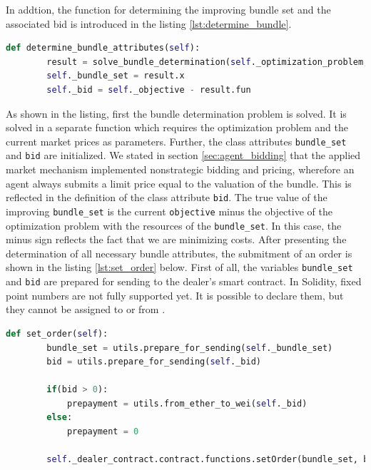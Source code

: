 In addtion, the function for determining the improving bundle set and the associated bid is introduced in the listing \ref{lst:determine_bundle}.

\begin{lstlisting}[label=lst:determine_bundle, caption=Determining of bundle attributes, language=Python]
    def determine_bundle_attributes(self):
        result = solve_bundle_determination(self._optimization_problem, self._mkt_prices)
        self._bundle_set = result.x
        self._bid = self._objective - result.fun
\end{lstlisting}

As shown in the listing, first the bundle determination problem is solved.
It is solved in a separate function which requires the optimization problem and the current market prices as parameters.
Further, the class attributes \verb|bundle_set| and \verb|bid| are initialized.
We stated in section \ref{sec:agent_bidding} that the applied market mechanism implemented nonstrategic bidding and pricing, wherefore 
an agent always submits a limit price equal to the valuation of the bundle. 
This is reflected in the definition of the class attribute \verb|bid|. The true value of the improving \verb|bundle_set| 
is the current \verb|objective| minus the objective of the optimization problem with the resources of the \verb|bundle_set|.
In this case, the minus sign reflects the fact that we are minimizing costs.
After presenting the determination of all necessary bundle attributes, the submitment of an order is shown in the listing \ref{lst:set_order} below.
First of all, the variables \verb|bundle_set| and \verb|bid| are prepared for sending to the dealer's smart contract.
In Solidity, fixed point numbers are not fully supported yet. It is possible to declare them, but they cannot be assigned to or from .

\begin{lstlisting}[float=htbp, label=lst:set_order, caption=Submitment of order, language=Python]
    def set_order(self):
        bundle_set = utils.prepare_for_sending(self._bundle_set)
        bid = utils.prepare_for_sending(self._bid)
        
        if(bid > 0):
            prepayment = utils.from_ether_to_wei(self._bid)
        else:
            prepayment = 0

        self._dealer_contract.contract.functions.setOrder(bundle_set, bid, prepayment).transact({'from': self._account_address, 'value': prepayment})
\end{lstlisting}

